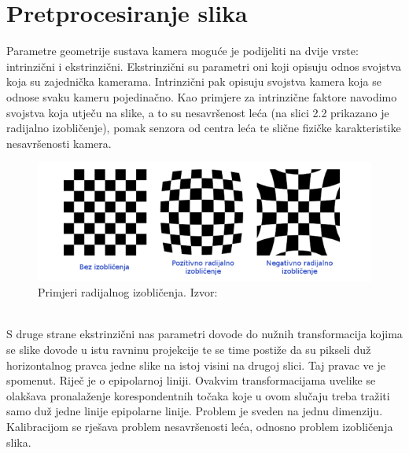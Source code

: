 \documentclass[times, utf8, zavrsni, numeric]{fer}
\begin{document}
\section{Pretprocesiranje slika}
Parametre geometrije sustava kamera moguće je  podijeliti na dvije vrste: intrinzični i ekstrinzični. Ekstrinzični su parametri oni koji opisuju odnos svojstva koja su zajednička kamerama. Intrinzični pak opisuju svojstva kamera koja se odnose svaku kameru pojedinačno. Kao primjere za intrinzične faktore navodimo svojstva koja utječu na slike, a to su nesavršenost leća (na slici 2.2 prikazano je radijalno izobličenje), pomak senzora od centra leća te slične fizičke karakteristike nesavršenosti kamera.\\
\begin{figure}[htb]
\centering
\includegraphics[scale=0.7]{img/slika2.png}
\caption{Primjeri radijalnog izobličenja. Izvor:\citep{bunjevac2017stereo}}
\label{fig:Radial}
\end{figure}\\
S druge strane ekstrinzični nas parametri dovode do nužnih transformacija kojima se slike dovode u istu ravninu projekcije te se time postiže da su pikseli duž horizontalnog pravca jedne slike na istoj visini na drugoj slici. Taj pravac ve je spomenut. Riječ je o epipolarnoj liniji. Ovakvim transformacijama uvelike se olakšava pronalaženje korespondentnih točaka koje u ovom slučaju treba tražiti samo duž jedne linije epipolarne linije. Problem je sveden na jednu dimenziju. Kalibracijom se rješava problem nesavršenosti leća, odnosno problem izobličenja slika.\\
\\
\end{document}
